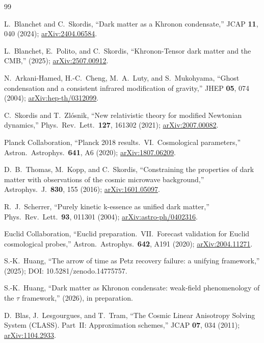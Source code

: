 \documentclass[prd,twocolumn,superscriptaddress,longbibliography,floatfix]{revtex4-2}
\begin{document}
\begin{thebibliography}{99}

L.~Blanchet and C.~Skordis,
``Dark matter as a Khronon condensate,''
JCAP \textbf{11}, 040 (2024);
\href{https://arxiv.org/abs/2404.06584}{arXiv:2404.06584}.

L.~Blanchet, E.~Polito, and C.~Skordis,
``Khronon-Tensor dark matter and the CMB,''
(2025);
\href{https://arxiv.org/abs/2507.00912}{arXiv:2507.00912}.

N.~Arkani-Hamed, H.-C.~Cheng, M.~A.~Luty,
and S.~Mukohyama,
``Ghost condensation and a consistent infrared
modification of gravity,''
JHEP \textbf{05}, 074 (2004);
\href{https://arxiv.org/abs/hep-th/0312099}{arXiv:hep-th/0312099}.

C.~Skordis and T.~Zl\'{o}snik,
``New relativistic theory for modified Newtonian
dynamics,''
Phys.\ Rev.\ Lett.\ \textbf{127}, 161302 (2021);
\href{https://arxiv.org/abs/2007.00082}{arXiv:2007.00082}.

Planck Collaboration,
``Planck 2018 results.\ VI.\ Cosmological
parameters,''
Astron.\ Astrophys.\ \textbf{641}, A6 (2020);
\href{https://arxiv.org/abs/1807.06209}{arXiv:1807.06209}.

D.~B.~Thomas, M.~Kopp, and C.~Skordis,
``Constraining the properties of dark matter with
observations of the cosmic microwave background,''
Astrophys.\ J.\ \textbf{830}, 155 (2016);
\href{https://arxiv.org/abs/1601.05097}{arXiv:1601.05097}.

R.~J.~Scherrer,
``Purely kinetic k-essence as unified dark matter,''
Phys.\ Rev.\ Lett.\ \textbf{93}, 011301 (2004);
\href{https://arxiv.org/abs/astro-ph/0402316}{arXiv:astro-ph/0402316}.

Euclid Collaboration,
``Euclid preparation.\ VII.\ Forecast
validation for Euclid cosmological probes,''
Astron.\ Astrophys.\ \textbf{642}, A191 (2020);
\href{https://arxiv.org/abs/2004.11271}{arXiv:2004.11271}.

S.-K.~Huang,
``The arrow of time as Petz recovery failure:
a unifying framework,''
(2025);
DOI: 10.5281/zenodo.14775757.

S.-K.~Huang,
``Dark matter as Khronon condensate: weak-field
phenomenology of the $\tau$ framework,''
(2026), in preparation.

D.~Blas, J.~Lesgourgues, and T.~Tram,
``The Cosmic Linear Anisotropy Solving System (CLASS).
Part~II: Approximation schemes,''
JCAP \textbf{07}, 034 (2011);
\href{https://arxiv.org/abs/1104.2933}{arXiv:1104.2933}.

\end{thebibliography}
\end{document}
